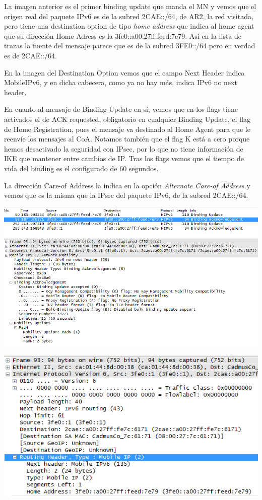 \documentclass{article}
\begin{document}
La imagen anterior es el primer binding update que manda el MN y vemos que el origen real del paquete IPv6 es de la subred 2CAE::/64, de AR2, la red visitada, pero tiene una destination option de tipo \textit{home address} que indica al home agent que su dirección Home Adress es la 3fe0::a00:27ff:feed:7e79. Así en la lista de trazas la fuente del mensaje parece que es de la subred 3FE0::/64 pero en verdad es de 2CAE::/64.

En la imagen del Destination Option vemos que el campo Next Header indica MobileIPv6, y en dicha cabecera, como ya no hay más, indica IPv6 no next header.

En cuanto al mensaje de Binding Update en sí, vemos que en los flags tiene activados el de ACK requested, obligatorio en cualquier Binding Update, el flag de Home Registration, pues el mensaje va destinado al Home Agent para que le reenvíe los mensajes al CoA. Notamos también que el flag K está a cero porque hemos desactivado la seguridad con IPsec, por lo que no tiene información de IKE que mantener entre cambios de IP. Tras los flags vemos que el tiempo de vida del binding es el configurado de 60 segundos.

La dirección Care-of Address la indica en la opción \textit{Alternate Care-of Address} y vemos que es la misma que la IPsrc del paquete IPv6, de la subred 2CAE::/64.

\begin{center}
	\includegraphics[scale=0.7]{images/bindACK.PNG}
\end{center}

\begin{center}
	\includegraphics[scale=0.7]{images/bindRoutHead.PNG}
\end{center}
\end{document}
